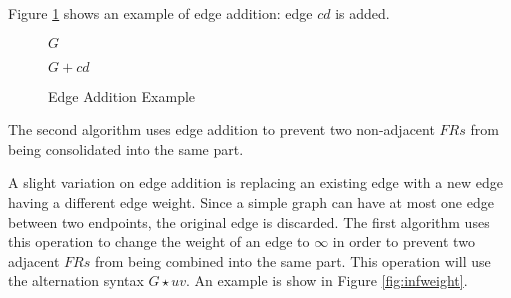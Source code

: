 Figure \ref{fig:eadd} shows an example of edge addition: edge \(cd\) is added.

\begin{figure}[h]
  \label{fig:eadd}
  \begin{minipage}{3in}
    \begin{center}

      \bigskip

      \(G\)
    \end{center}
  \end{minipage}
  \begin{minipage}{3in}
    \begin{center}

      \bigskip

      \(G+cd\)
    \end{center}
  \end{minipage}
  \caption{Edge Addition Example}
\end{figure}

The second algorithm uses edge addition to prevent two non-adjacent \(FRs\) from being consolidated into the same
part.

A slight variation on edge addition is replacing an existing edge with a new edge having a different edge weight.
Since a simple graph can have at most one edge between two endpoints, the original edge is discarded.  The first
algorithm uses this operation to change the weight of an edge to \(\infty\) in order to prevent two adjacent
\(FRs\) from being combined into the same part.  This operation will use the alternation syntax \(G\star uv\).
An example is show in Figure \ref{fig:infweight}.

